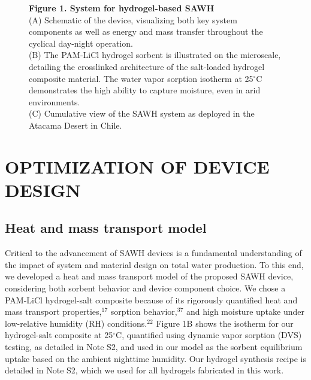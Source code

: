 \documentclass[11pt]{article}
\newcommand{\figbox}[1]{%
  \fbox{\parbox[c][#1][c]{0.92\textwidth}{\centering\itshape [figure image]}}}
\begin{document}
\begin{figure}[!ht]
\centering
\figbox{6cm}
\caption*{\textbf{Figure 1. System for hydrogel-based SAWH}\\
(A) Schematic of the device, visualizing both key system components as well as energy and mass transfer throughout the cyclical day-night operation.\\
(B) The PAM-LiCl hydrogel sorbent is illustrated on the microscale, detailing the crosslinked architecture of the salt-loaded hydrogel composite material. The water vapor sorption isotherm at 25$^{\circ}$C demonstrates the high ability to capture moisture, even in arid environments.\\
(C) Cumulative view of the SAWH system as deployed in the Atacama Desert in Chile.}
\end{figure}

\section{OPTIMIZATION OF DEVICE DESIGN}

\subsection{Heat and mass transport model}

Critical to the advancement of SAWH devices is a fundamental understanding of the impact of system and material design on total water production. To this end, we developed a heat and mass transport model of the proposed SAWH device, considering both sorbent behavior and device component choice. We chose a PAM-LiCl hydrogel-salt composite because of its rigorously quantified heat and mass transport properties,$^{17}$ sorption behavior,$^{37}$ and high moisture uptake under low-relative humidity (RH) conditions.$^{22}$ Figure 1B shows the isotherm for our hydrogel-salt composite at 25$^{\circ}$C, quantified using dynamic vapor sorption (DVS) testing, as detailed in Note S2, and used in our model as the sorbent equilibrium uptake based on the ambient nighttime humidity. Our hydrogel synthesis recipe is detailed in Note S2, which we used for all hydrogels fabricated in this work.
\end{document}
